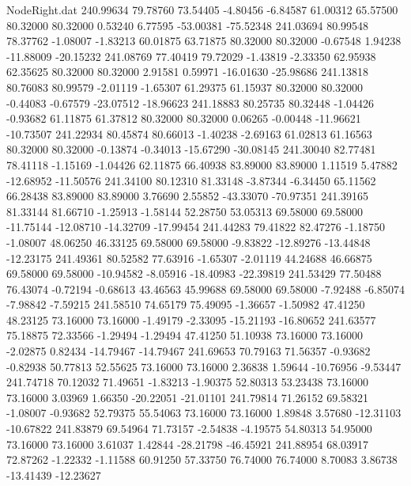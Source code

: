 \begin{filecontents}{NodeRight.dat}
 240.99634   79.78760   73.54405    -4.80456   -6.84587   61.00312   65.57500   80.32000   80.32000    0.53240    6.77595  -53.00381  -75.52348
 241.03694   80.99548   78.37762    -1.08007   -1.83213   60.01875   63.71875   80.32000   80.32000   -0.67548    1.94238  -11.88009  -20.15232
 241.08769   77.40419   79.72029    -1.43819   -2.33350   62.95938   62.35625   80.32000   80.32000    2.91581    0.59971  -16.01630  -25.98686
 241.13818   80.76083   80.99579    -2.01119   -1.65307   61.29375   61.15937   80.32000   80.32000   -0.44083   -0.67579  -23.07512  -18.96623
 241.18883   80.25735   80.32448    -1.04426   -0.93682   61.11875   61.37812   80.32000   80.32000    0.06265   -0.00448  -11.96621  -10.73507
 241.22934   80.45874   80.66013    -1.40238   -2.69163   61.02813   61.16563   80.32000   80.32000   -0.13874   -0.34013  -15.67290  -30.08145
 241.30040   82.77481   78.41118    -1.15169   -1.04426   62.11875   66.40938   83.89000   83.89000    1.11519    5.47882  -12.68952  -11.50576
 241.34100   80.12310   81.33148    -3.87344   -6.34450   65.11562   66.28438   83.89000   83.89000    3.76690    2.55852  -43.33070  -70.97351
 241.39165   81.33144   81.66710    -1.25913   -1.58144   52.28750   53.05313   69.58000   69.58000  -11.75144  -12.08710  -14.32709  -17.99454
 241.44283   79.41822   82.47276    -1.18750   -1.08007   48.06250   46.33125   69.58000   69.58000   -9.83822  -12.89276  -13.44848  -12.23175
 241.49361   80.52582   77.63916    -1.65307   -2.01119   44.24688   46.66875   69.58000   69.58000  -10.94582   -8.05916  -18.40983  -22.39819
 241.53429   77.50488   76.43074    -0.72194   -0.68613   43.46563   45.99688   69.58000   69.58000   -7.92488   -6.85074   -7.98842   -7.59215
 241.58510   74.65179   75.49095    -1.36657   -1.50982   47.41250   48.23125   73.16000   73.16000   -1.49179   -2.33095  -15.21193  -16.80652
 241.63577   75.18875   72.33566    -1.29494   -1.29494   47.41250   51.10938   73.16000   73.16000   -2.02875    0.82434  -14.79467  -14.79467
 241.69653   70.79163   71.56357    -0.93682   -0.82938   50.77813   52.55625   73.16000   73.16000    2.36838    1.59644  -10.76956   -9.53447
 241.74718   70.12032   71.49651    -1.83213   -1.90375   52.80313   53.23438   73.16000   73.16000    3.03969    1.66350  -20.22051  -21.01101
 241.79814   71.26152   69.58321    -1.08007   -0.93682   52.79375   55.54063   73.16000   73.16000    1.89848    3.57680  -12.31103  -10.67822
 241.83879   69.54964   71.73157    -2.54838   -4.19575   54.80313   54.95000   73.16000   73.16000    3.61037    1.42844  -28.21798  -46.45921
 241.88954   68.03917   72.87262    -1.22332   -1.11588   60.91250   57.33750   76.74000   76.74000    8.70083    3.86738  -13.41439  -12.23627

\end{filecontents}
